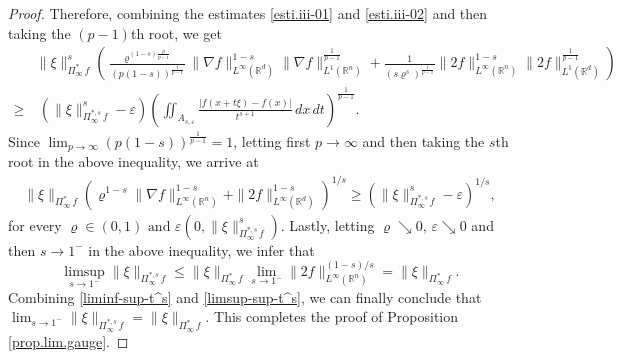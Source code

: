 \documentclass[11pt, reqno]{article}
\theoremstyle{definition}
\numberwithin{equation}{section}
\newcommand{\R}{\mathbb{R}}
\begin{document}
\begin{proof}
Therefore, combining the estimates \eqref{esti.iii-01} and \eqref{esti.iii-02} and then taking the $(p - 1)$th root, we get
	\begin{equation}
	\begin{split}
		& \| \xi \|_{\Pi^\ast_\infty \, f}^s 
  		\left(
     	\frac{\varrho^{(1 - s)\frac{p}{p - 1}}}{(p(1 - s))^{\frac{1}{p - 1}}}
     	\| \nabla f \|^{1 - s}_{L^\infty(\mathbb{R}^d)}
     	\| \nabla f \|_{L^1(\mathbb{R}^n)}^{\frac{1}{p - 1}}
     	+ 
     	\frac{1}{(s\varrho^s)^{\frac{1}{p - 1}}}
     	\| 2f \|^{1 - s}_{L^\infty(\mathbb{R}^n)}
     	\| 2f \|_{L^1(\mathbb{R}^d)}^{\frac{1}{p - 1}}
  		\right)
		\\
		\geq & ~
		\left( \| \xi \|^s_{\Pi^{\ast, s}_\infty \, f} - \varepsilon 			\right)
  		\left( \iint_{A_{s, \varepsilon}} 
  		\frac{|f(x + t\xi) - f(x)|}{t^{s + 1}} \, dx \, dt \right)^{\frac{1}{p - 1}}.
	\end{split}
	\end{equation}
Since $\textstyle\lim_{p \to \infty} (p(1 - s))^{\frac{1}{p - 1}} = 1$, letting first $p \to \infty$ and then taking the $s$th root in the above inequality, we arrive at
	\begin{align*}
		\| \xi \|_{\Pi^\ast_\infty \, f} \left( 
		\varrho^{1 - s} \| \nabla f \|^{1 - s}_{L^\infty(\mathbb{R}^n)} 
		+
		\| 2f \|^{1 - s}_{L^\infty(\mathbb{R}^d)}
		\right)^{1/s}
		\geq  \left( \| \xi \|^s_{\Pi^{\ast, s}_\infty \, f} - \varepsilon \right)^{1/s}, 
	\end{align*}
for every $\varrho \in (0, 1) \text{ and } \varepsilon (0, \| \xi \|^s_{\Pi^{\ast, s}_\infty \, f})$.
Lastly, letting $\varrho \searrow 0$, $\varepsilon \searrow 0$ and then $s \to 1^-$ in the above inequality, we infer that
	\begin{equation}\label{limsup-sup-t^s}
		\limsup_{s \to 1^-} \| \xi \|_{\Pi^{\ast, s}_\infty \, f} \leq \| \xi \|_{\Pi^\ast_\infty \, f} \lim_{s \to 1^-} \| 2 f \|^{(1 - s)/s}_{L^\infty(\R^n)} =  \| \xi \|_{\Pi^\ast_\infty \, f}.
	\end{equation}
Combining \eqref{liminf-sup-t^s} and \eqref{limsup-sup-t^s}, we can finally conclude that $\textstyle\lim_{s \to 1^-} \| \xi \|_{\Pi^{\ast, s}_\infty \, f} = \| \xi \|_{\Pi^\ast_\infty \, f}$.
This completes the proof of Proposition \ref{prop.lim.gauge}.
\end{proof}
\end{document}
